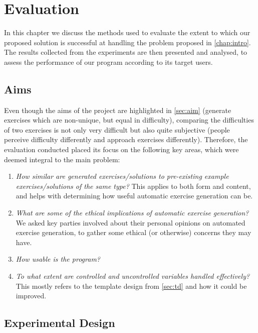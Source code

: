\documentclass{l4proj}
\begin{document}
\chapter{Evaluation} 
\label{chap:ev}

In this chapter we discuss the methods used to evaluate the extent to which our proposed solution is successful at handling the problem proposed in \autoref{chap:intro}. The results collected from the experiments are then presented and 	analysed, to assess the performance of our program according to its target users.

\section{Aims}
\label{sec:evalAims}

Even though the aims of the project are highlighted in \autoref{sec:aim} (generate exercises which are non-unique, but equal in difficulty), comparing the difficulties of two exercises is not only very difficult but also quite subjective (people perceive difficulty differently and approach exercises differently). Therefore, the evaluation conducted placed its focus on the following key areas, which were deemed integral to the main problem:

\begin{enumerate}
	\item
	\emph{How similar are generated exercises/solutions to pre-existing example exercises/solutions of the same type?} This applies to both form and content, and helps with determining how useful automatic exercise generation can be.
	\item
	\emph{What are some of the ethical implications of automatic exercise generation?} We asked key parties involved about their personal opinions on automated exercise generation, to gather some ethical (or otherwise) concerns they may have.
	\item
	\emph{How usable is the program?} 
	\item
	\emph{To what extent are controlled and uncontrolled variables handled effectively?} This mostly refers to the template design from \autoref{sec:td} and how it could be improved.
\end{enumerate}

\section{Experimental Design}
\end{document}
